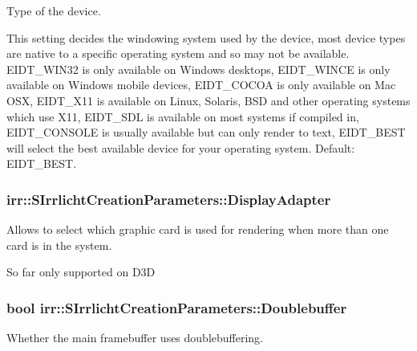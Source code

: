 Type of the device. 

This setting decides the windowing system used by the device, most device types are native to a specific operating system and so may not be available. E\+I\+D\+T\+\_\+\+W\+I\+N32 is only available on Windows desktops, E\+I\+D\+T\+\_\+\+W\+I\+N\+CE is only available on Windows mobile devices, E\+I\+D\+T\+\_\+\+C\+O\+C\+OA is only available on Mac O\+SX, E\+I\+D\+T\+\_\+\+X11 is available on Linux, Solaris, B\+SD and other operating systems which use X11, E\+I\+D\+T\+\_\+\+S\+DL is available on most systems if compiled in, E\+I\+D\+T\+\_\+\+C\+O\+N\+S\+O\+LE is usually available but can only render to text, E\+I\+D\+T\+\_\+\+B\+E\+ST will select the best available device for your operating system. Default\+: E\+I\+D\+T\+\_\+\+B\+E\+ST. 
\subsubsection[{\texorpdfstring{Display\+Adapter}{DisplayAdapter}}]{ irr\+::\+S\+Irrlicht\+Creation\+Parameters\+::\+Display\+Adapter}\hypertarget{structirr_1_1SIrrlichtCreationParameters_aa58e8699007135f9d950712f96fab730}{}\label{structirr_1_1SIrrlichtCreationParameters_aa58e8699007135f9d950712f96fab730}


Allows to select which graphic card is used for rendering when more than one card is in the system. 

So far only supported on D3D 
\subsubsection[{\texorpdfstring{Doublebuffer}{Doublebuffer}}]{\setlength{\rightskip}{0pt plus 5cm}bool irr\+::\+S\+Irrlicht\+Creation\+Parameters\+::\+Doublebuffer}\hypertarget{structirr_1_1SIrrlichtCreationParameters_a49f2c3ed6cc7a28f2fde6683ac0b3267}{}\label{structirr_1_1SIrrlichtCreationParameters_a49f2c3ed6cc7a28f2fde6683ac0b3267}


Whether the main framebuffer uses doublebuffering. 

